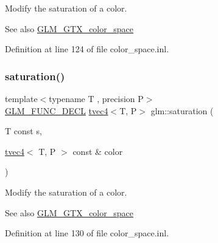Modify the saturation of a color. \begin{DoxySeeAlso}{See also}
\mbox{\hyperlink{group__gtx__color__space}{G\+L\+M\+\_\+\+G\+T\+X\+\_\+color\+\_\+space}} 
\end{DoxySeeAlso}


Definition at line 124 of file color\+\_\+space.\+inl.

\mbox{\label{group__gtx__color__space_ga2033e0566c595230714af396744e8a61}} 
\subsubsection{\texorpdfstring{saturation()}{saturation()}\hspace{0.1cm}{\footnotesize\ttfamily [3/3]}}
{\footnotesize\ttfamily template$<$typename T , precision P$>$ \\
\mbox{\hyperlink{setup_8hpp_ab2d052de21a70539923e9bcbf6e83a51}{G\+L\+M\+\_\+\+F\+U\+N\+C\+\_\+\+D\+E\+CL}} \mbox{\hyperlink{structglm_1_1tvec4}{tvec4}}$<$T, P$>$ glm\+::saturation (\begin{DoxyParamCaption}\item[{T const}]{s,  }\item[{\mbox{\hyperlink{structglm_1_1tvec4}{tvec4}}$<$ T, P $>$ const \&}]{color }\end{DoxyParamCaption})}

Modify the saturation of a color. \begin{DoxySeeAlso}{See also}
\mbox{\hyperlink{group__gtx__color__space}{G\+L\+M\+\_\+\+G\+T\+X\+\_\+color\+\_\+space}} 
\end{DoxySeeAlso}


Definition at line 130 of file color\+\_\+space.\+inl.

